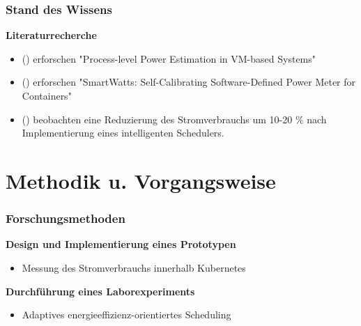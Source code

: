 \documentclass{beamer}
\begin{document}
\begin{frame}
    \frametitle{Stand des Wissens}
    \textbf{Literaturrecherche}
    \begin{itemize}
        \item \citeauthor{colmant:hal-01130030} (\citeyear{colmant:hal-01130030}) erforschen "Process-level Power Estimation in VM-based Systems"
        \item \citeauthor{fieni:hal-02470128} (\citeyear{fieni:hal-02470128}) erforschen "SmartWatts: Self-Calibrating Software-Defined Power Meter for Containers"
        \item \citeauthor{8705815} (\citeyear{8705815}) beobachten eine Reduzierung des Stromverbrauchs um 10-20 \% nach Implementierung eines intelligenten Schedulers.
    \end{itemize}
\end{frame}

\section{Methodik u. Vorgangsweise}

\begin{frame}
    \frametitle{Forschungsmethoden}
    \textbf{Design und Implementierung eines Prototypen}
    \begin{itemize}
        \item Messung des Stromverbrauchs innerhalb Kubernetes
    \end{itemize}

    \textbf{Durchführung eines Laborexperiments}
    \begin{itemize}
        \item Adaptives energieeffizienz-orientiertes Scheduling
    \end{itemize}
\end{frame}
\end{document}

